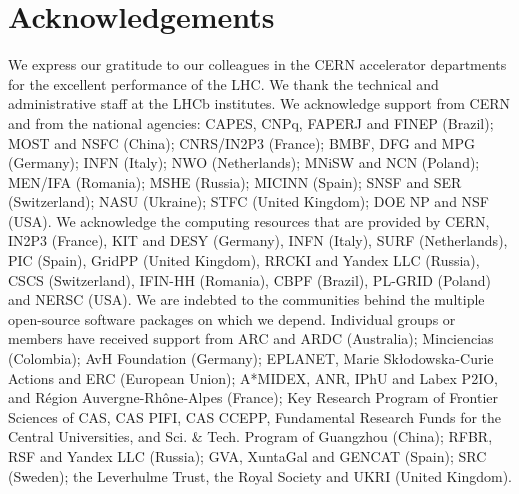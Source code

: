 \section*{Acknowledgements}
%
%
\noindent We express our gratitude to our colleagues in the CERN
accelerator departments for the excellent performance of the LHC. We
thank the technical and administrative staff at the LHCb
institutes.
We acknowledge support from CERN and from the national agencies:
CAPES, CNPq, FAPERJ and FINEP (Brazil); 
MOST and NSFC (China); 
CNRS/IN2P3 (France); 
BMBF, DFG and MPG (Germany); 
INFN (Italy); 
NWO (Netherlands); 
MNiSW and NCN (Poland); 
MEN/IFA (Romania); 
MSHE (Russia); 
MICINN (Spain); 
SNSF and SER (Switzerland); 
NASU (Ukraine); 
STFC (United Kingdom); 
DOE NP and NSF (USA).
We acknowledge the computing resources that are provided by CERN, IN2P3
(France), KIT and DESY (Germany), INFN (Italy), SURF (Netherlands),
PIC (Spain), GridPP (United Kingdom), RRCKI and Yandex
LLC (Russia), CSCS (Switzerland), IFIN-HH (Romania), CBPF (Brazil),
PL-GRID (Poland) and NERSC (USA).
We are indebted to the communities behind the multiple open-source
software packages on which we depend.
Individual groups or members have received support from
ARC and ARDC (Australia);
Minciencias (Colombia);
AvH Foundation (Germany);
EPLANET, Marie Sk\l{}odowska-Curie Actions and ERC (European Union);
A*MIDEX, ANR, IPhU and Labex P2IO, and R\'{e}gion Auvergne-Rh\^{o}ne-Alpes (France);
Key Research Program of Frontier Sciences of CAS, CAS PIFI, CAS CCEPP, 
Fundamental Research Funds for the Central Universities, 
and Sci. \& Tech. Program of Guangzhou (China);
RFBR, RSF and Yandex LLC (Russia);
GVA, XuntaGal and GENCAT (Spain);
SRC (Sweden);
the Leverhulme Trust, the Royal Society
 and UKRI (United Kingdom).


